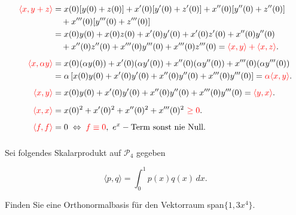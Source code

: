 \begin{solution}
    \begin{equation*}
        \begin{aligned}
            \textcolor{red}{\langle x, y+z \rangle} &= x(0)[y(0)+z(0)] + x'(0)[y'(0)+z'(0)] + x''(0)[y''(0)+z''(0)] \\ 
            & \quad + x'''(0)[y'''(0)+z'''(0)] \\
            &= x(0)y(0) + x(0)z(0) + x'(0)y'(0) + x'(0)z'(0) + x''(0)y''(0) \\
            & \quad + x''(0)z''(0) + x'''(0)y'''(0) + x'''(0)z'''(0) = \textcolor{red}{\langle x,y \rangle + \langle x,z \rangle}. \\[0.5em]
            \textcolor{red}{\langle x, \alpha y \rangle} &= x(0)(\alpha y(0)) + x'(0)(\alpha y'(0)) + x''(0)(\alpha y''(0)) + x'''(0)(\alpha y'''(0)) \\
            &= \alpha \left[ x(0)y(0) + x'(0)y'(0) + x''(0)y''(0) + x'''(0)y'''(0) \right] = \textcolor{red}{\alpha \langle x,y \rangle}. \\[0.5em]
            \textcolor{red}{\langle x, y \rangle} &= x(0)y(0) + x'(0)y'(0) + x''(0)y''(0) + x'''(0)y'''(0) = \textcolor{red}{\langle y, x \rangle}. \\[0.5em]
            \textcolor{red}{\langle x, x \rangle} &= x(0)^2 + x'(0)^2 + x''(0)^2 + x'''(0)^2 \ \textcolor{red}{\geq 0}. \\[0.5em]
            \textcolor{red}{\langle f, f \rangle} &= 0 \; \Leftrightarrow \; \textcolor{red}{f \equiv 0}, \ e^x-\text{Term sonst nie Null}. 
        \end{aligned}
    \end{equation*}


\end{solution}

\newpage

\subsubsection{} %

Sei folgendes Skalarprodukt auf \( \mathcal{P}_4 \) gegeben

\begin{equation*}
    \langle p,q \rangle = \int_{0}^{1} p(x)q(x) \,dx.
\end{equation*}

Finden Sie eine Orthonormalbasis für den Vektorraum span\( \{1,3x^4\} \). 

\vspace{1\baselineskip}

